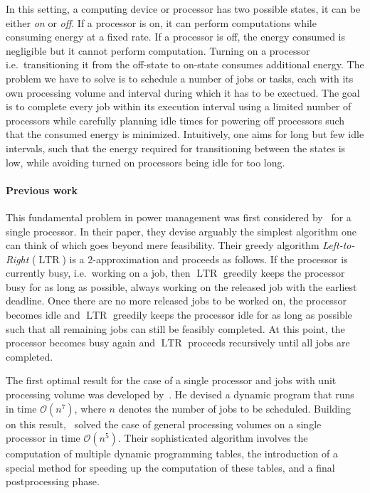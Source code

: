 \documentclass[a4paper]{article}
\DeclareMathOperator{\ltr}{LTR}
\begin{document}
In this setting, a computing device or processor has two possible states, it can be either \emph{on} or \emph{off}.
If a processor is on, it can perform computations while consuming energy at a fixed rate.
If a processor is off, the energy consumed is negligible but it cannot perform computation.
Turning on a processor i.e.\ transitioning it from the off-state to on-state consumes additional energy.
The problem we have to solve is to schedule a number of jobs or tasks, each with its own processing volume and interval during which it has to be exectued.
The goal is to complete every job within its execution interval using a limited number of processors while carefully planning idle times for powering off processors such that the consumed energy is minimized.
Intuitively, one aims for long but few idle intervals, such that the energy required for transitioning between the states is low, while avoiding turned on processors being idle for too long.

\paragraph{Previous work}
This fundamental problem in power management was first considered by~\cite{irani_left_to_right_soda_2003} for a single processor.
In their paper, they devise arguably the simplest algorithm one can think of which goes beyond mere feasibility.
Their greedy algorithm \emph{Left-to-Right} ($\ltr$) is a $2$-approximation and proceeds as follows.
If the processor is currently busy, i.e.\ working on a job, then $\ltr$ greedily keeps the processor busy for as long as possible, always working on the released job with the earliest deadline.
Once there are no more released jobs to be worked on, the processor becomes idle and $\ltr$ greedily keeps the processor idle for as long as possible such that all remaining jobs can still be feasibly completed.
At this point, the processor becomes busy again and $\ltr$ proceeds recursively until all jobs are completed.

The first optimal result for the case of a single processor and jobs with unit processing volume was developed by~\cite{baptiste_unit_jobs}.
He devised a dynamic program that runs in time $\mathcal{O}(n^7)$, where $n$ denotes the number of jobs to be scheduled.
Building on this result,~\cite{baptiste_general_jobs} solved the case of general processing volumes on a single processor in time $\mathcal{O}(n^5)$.
Their sophisticated algorithm involves the computation of multiple dynamic programming tables, the introduction of a special method for speeding up the computation of these tables, and a final postprocessing phase.
\end{document}
